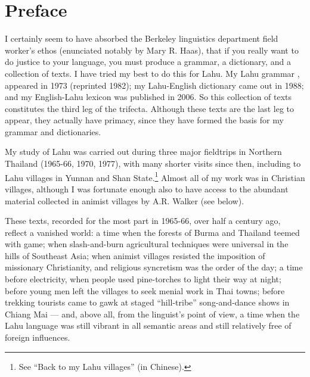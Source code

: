 \vspace{0.25em}

\renewcommand{\thefootnote}{\arabic{footnote}}
\setcounter{footnote}{0}


\section*{Preface}
I certainly seem to have absorbed the Berkeley linguistics department
field worker's ethos (enunciated notably by Mary R. Haas), that if you
really want to do justice to your language, you must produce a grammar,
a dictionary, and a collection of texts. I have tried my best to do this
for Lahu. My Lahu grammar \citep[abbreviated ``GL'']{matisoff1973grammar}, appeared in 1973 (reprinted 1982); my
Lahu-English dictionary \citep[abbreviated ``DL'']{88} came out in 1988; and my English-Lahu
lexicon \citep[abbreviated ``ELL'']{matisoff2006english} was published in 2006. So this collection of texts
constitutes the third leg of the trifecta. Although these texts are the
last leg to appear, they actually have primacy, since they have formed
the basis for my grammar and dictionaries.

My study of Lahu was carried out during three major fieldtrips in
Northern Thailand (1965-66, 1970, 1977), with many shorter visits since
then, including to Lahu villages in Yunnan and Shan State.\footnote{See
\citet{matisoff2008} ``Back to my Lahu villages'' (in Chinese).} Almost all of my
work was in Christian villages, although I was fortunate enough also to
have access to the abundant material collected in animist villages by
A.R. Walker (see below).

These texts, recorded for the most part in 1965-66, over half a century
ago, reflect a vanished world: a time when the forests of Burma and
Thailand teemed with game; when slash-and-burn agricultural techniques
were universal in the hills of Southeast Asia; when animist villages
resisted the imposition of missionary Christianity, and religious
syncretism was the order of the day; a time before electricity, when
people used pine-torches to light their way at night; before young men
left the villages to seek menial work in Thai towns; before trekking
tourists came to gawk at staged ``hill-tribe'' song-and-dance shows in
Chiang Mai --- and, above all, from the linguist's point of view, a
time when the Lahu language was still vibrant in all semantic areas and
still relatively free of foreign influences.

